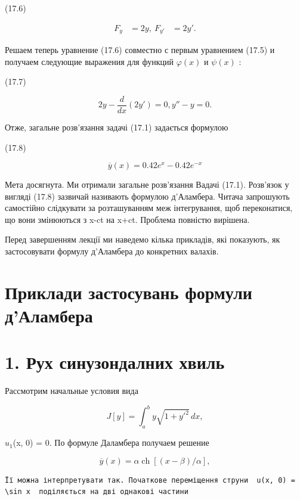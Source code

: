 \documentclass[
  ukrainian,
]{article}
\begin{document}
(17.6)

\[
\begin{aligned} F_y &= 2y, \ F_{y'} &= 2y'. \end{aligned}
\]

Решаем теперь уравнение (17.6) совместно с первым уравнением (17.5) и
получаем следующие выражения для функций \(\varphi(x)\) и \(\psi(x)\) :

(17.7)

\[
2y - \frac{d}{dx}(2y') = 0,
y'' - y = 0.
\]

Отже, загальне розв'язання задачі (17.1) задається формулою

(17.8)

\[
\overline{y}(x) = 0.42e^x - 0.42e^{-x}
\]

Мета досягнута. Ми отримали загальне розв'язання Вадачі (17.1).
Розв'язок у вигляді (17.8) зазвичай називають формулою д'Аламбера.
Читача запрошують самостійно слідкувати за розташуванням меж
інтегрування, щоб переконатися, що вони змінюються з x-ct на x+ct.
Проблема повністю вирішена.

Перед завершенням лекції ми наведемо кілька прикладів, які показують, як
застосовувати формулу д'Аламбера до конкретних валахів.

\section{Приклади застосувань формули
д'Аламбера}\label{ux43fux440ux438ux43aux43bux430ux434ux438-ux437ux430ux441ux442ux43eux441ux443ux432ux430ux43dux44c-ux444ux43eux440ux43cux443ux43bux438-ux434ux430ux43bux430ux43cux431ux435ux440ux430}

\section{1. Рух синузондалних
хвиль}\label{ux440ux443ux445-ux441ux438ux43dux443ux437ux43eux43dux434ux430ux43bux43dux438ux445-ux445ux432ux438ux43bux44c}

Рассмотрим начальные условия вида

\[
J[y] = \int_a^b y \sqrt{1 + y'^2} \, dx,
\]

\(u_1\)(x, 0) = 0. По формуле Даламбера получаем решение

\[
\overline{y}(x) = \alpha \operatorname{ch}[(x-\beta)/\alpha],
\]

\begin{verbatim}
Її можна інтерпретувати так. Початкове переміщення струни  u(x, 0) = \sin x  поділяється на дві однакові частини
\end{verbatim}
\end{document}

